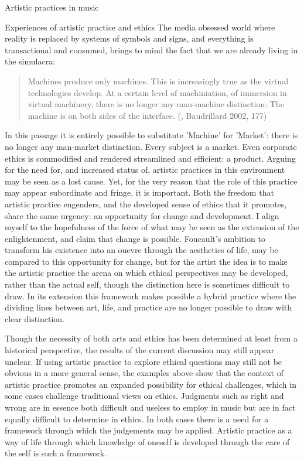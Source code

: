 \documentclass[presentation]{beamer}
\makeatletter
\newcommand{\cslcitation}[2]
 {\protect\hyper@linkstart{cite}{citeproc_bib_item_#1}#2\hyper@linkend}
\makeatother
\begin{document}
\begin{frame}[label={sec:org952e88c}]{Artistic practices in music}
\begin{block}{Experiences of artistic practice and ethics}
The media obsessed world where reality is replaced by systems of symbols and signs, and everything is transactional and consumed, brings to mind the fact that we are already living in the simulacra:
\begin{quote}
Machines produce only machines. This is increasingly true as the virtual technologies develop. At a certain level of machiniation, of immersion in virtual machinery, there is no longer any man-machine distinction: The machine is on both sides of the interface. (, \cslcitation{1}{Baudrillard 2002, 177})
\end{quote}
In this passage it is entirely possible to substitute 'Machine' for 'Market': there is no longer any man-market distinction. Every subject is a market. Even corporate ethics is commodified and rendered streamlined and efficient: a product. Arguing for the need for, and increased status of, artistic practices in this environment may be seen as a lost cause. Yet, for the very reason that the role of this practice may appear subordinate and fringe, it is important. Both the freedom that artistic practice engenders, and the developed sense of ethics that it promotes, share the same urgency: an opportunity for change and development. I align myself to the hopefulness of the force of what may be seen as the extension of the enlightenment, and claim that change is possible.
Foucault's ambition to transform his existence into an ouevre through the aesthetics of life, may be compared to this opportunity for change, but for the artist the idea is to make the artistic practice the arena on which ethical perspectives may be developed, rather than the actual self, though the distinction here is sometimes difficult to draw. In its extension this framework makes possible a hybrid practice where the dividing lines between art, life, and practice are no longer possible to draw with clear distinction.

Though the necessity of both arts and ethics has been determined at least from a historical perspective, the results of the current discussion may still appear unclear.
If using artistic practice to explore ethical questions may still not be obvious in a more general sense, the examples above show that the context of artistic practice promotes an expanded possibility for ethical challenges, which in some cases challenge traditional views on ethics.
Judgments such as right and wrong are in essence both difficult and useless to employ in music but are in fact equally difficult to determine in ethics. In both cases there is a need for a framework through which the judgements may be applied. Artistic practice as a way of life through which knowledge of oneself is developed through the care of the self is such a framework.


\end{block}
\end{frame}
\end{document}
